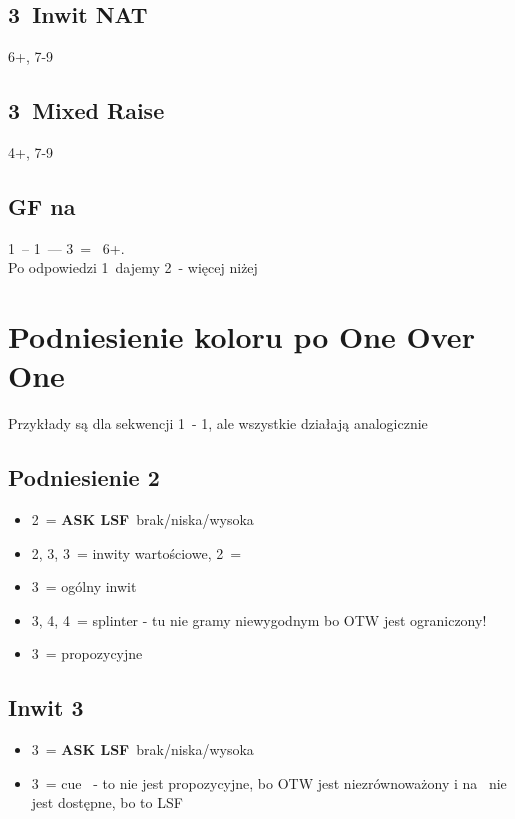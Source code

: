 \documentclass[12pt, a4paper]{article}
\newcommand{\lsf}{\color{WildStrawberry}\textbf{ASK LSF}\color{black}}
\begin{document}
\subsection*{3\clubs\ Inwit NAT}
6+\clubs, 7-9

\subsection*{3\diams\ Mixed Raise}
4+\diams, 7-9

\subsection*{GF na \diams}
1\diams\ -- 1\spades\ --- 3\hearts\ = \gf\, 6+\diams. \\
Po odpowiedzi 1\hearts\ dajemy 2\nt\ - więcej niżej


\pagebreak
\section{Podniesienie koloru po One Over One}
Przykłady są dla sekwencji 1\clubs\ - 1\hearts, ale wszystkie działają analogicznie
\subsection*{Podniesienie 2\hearts}
\begin{itemize}
    \item 2\spades\ = \lsf\ brak/niska/wysoka \gf\ 
    \item 2\nt, 3\clubs, 3\diams\ = inwity wartościowe, 2\nt\ = \spades
    \item 3\hearts\ = ogólny inwit
    \item 3\spades, 4\clubs, 4\diams\ = splinter - tu nie gramy niewygodnym bo OTW jest ograniczony!
    \item 3\nt\ = propozycyjne
\end{itemize}

\subsection*{Inwit 3\hearts}
\begin{itemize}
    \item 3\spades\ = \lsf\ brak/niska/wysoka
    \item 3\nt\ = cue \spades\ - to nie jest propozycyjne, bo OTW jest niezrównoważony i na \spades\ nie jest dostępne, bo to LSF
\end{itemize}
\end{document}
